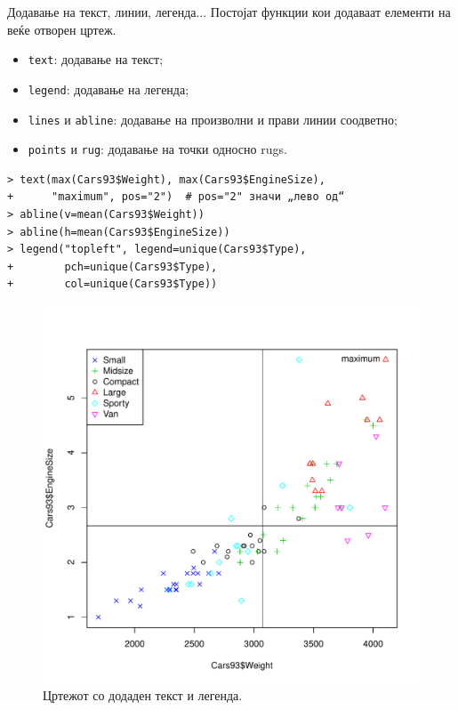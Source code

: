 \documentclass[hyperref={unicode}, xcolor={svgnames, table},
usepdftitle=false]{beamer}
\theoremstyle{remark}
\begin{document}
\begin{frame}[fragile]{Додавање на текст, линии, легенда...}
  Постојат функции кои додаваат елементи на веќе отворен цртеж.
  \begin{itemize}
  \item \texttt{text}: додавање на текст;
  \item \texttt{legend}: додавање на легенда;
  \item \texttt{lines} и \texttt{abline}: додавање на произволни и
    прави линии соодветно;
  \item \texttt{points} и \texttt{rug}: додавање на точки односно
    rugs.
  \end{itemize}
\begin{verbatim}
> text(max(Cars93$Weight), max(Cars93$EngineSize),
+      "maximum", pos="2")  # pos="2" значи „лево од“
> abline(v=mean(Cars93$Weight))
> abline(h=mean(Cars93$EngineSize))
> legend("topleft", legend=unique(Cars93$Type),
+        pch=unique(Cars93$Type),
+        col=unique(Cars93$Type))
\end{verbatim}
\end{frame}

\begin{frame}
  \begin{figure}
    \centering
    \includegraphics[width=.66\textwidth]{Plot_Cars_Decorated.pdf}
    \caption{Цртежот со додаден текст и легенда.}
  \end{figure}
\end{frame}
\end{document}
